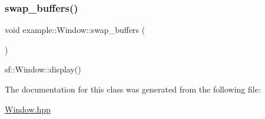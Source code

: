 \subsubsection{\texorpdfstring{swap\_buffers()}{swap\_buffers()}}
{\footnotesize\ttfamily void example\+::\+Window\+::swap\+\_\+buffers (\begin{DoxyParamCaption}{ }\end{DoxyParamCaption})}



sf\+::\+Window\+::display() 



The documentation for this class was generated from the following file\+:\begin{DoxyCompactItemize}
\item 
\mbox{\hyperlink{_window_8hpp}{Window.\+hpp}}\end{DoxyCompactItemize}
